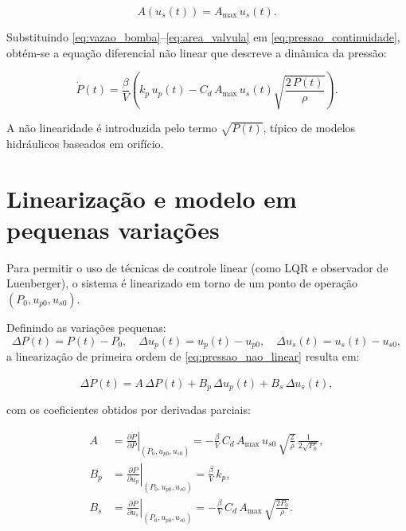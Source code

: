 \begin{equation}
A(u_s(t)) = A_{\max}\, u_s(t).
\label{eq:area_valvula}
\end{equation}

Substituindo \eqref{eq:vazao_bomba}--\eqref{eq:area_valvula} em \eqref{eq:pressao_continuidade}, obtém-se a equação diferencial não linear que descreve a dinâmica da pressão:

\begin{equation}
\dot{P}(t) =
\frac{\beta}{V}\left(
k_p\,u_p(t) - C_d\,A_{\max}\,u_s(t)\sqrt{\frac{2\,P(t)}{\rho}}
\right).
\label{eq:pressao_nao_linear}
\end{equation}

A não linearidade é introduzida pelo termo $\sqrt{P(t)}$, típico de modelos hidráulicos baseados em orifício.

\section{Linearização e modelo em pequenas variações}
\label{sec:controle-linearizacao}

Para permitir o uso de técnicas de controle linear (como LQR e observador de Luenberger), o sistema é linearizado em torno de um ponto de operação $(P_0, u_{p0}, u_{s0})$.

Definindo as variações pequenas:
\[
\Delta P(t)=P(t)-P_0, \quad
\Delta u_p(t)=u_p(t)-u_{p0}, \quad
\Delta u_s(t)=u_s(t)-u_{s0},
\]
a linearização de primeira ordem de \eqref{eq:pressao_nao_linear} resulta em:

\begin{equation}
\Delta\dot{P}(t) = A\,\Delta P(t) + B_p\,\Delta u_p(t) + B_s\,\Delta u_s(t),
\label{eq:linearizacao_geral}
\end{equation}

com os coeficientes obtidos por derivadas parciais:

\begin{align}
A &=
\left.\frac{\partial \dot{P}}{\partial P}\right|_{(P_0,u_{p0},u_{s0})}
= -\frac{\beta}{V}\, C_d\,A_{\max}\,u_{s0}\,
\sqrt{\frac{2}{\rho}}\,
\frac{1}{2\sqrt{P_0}},
\label{eq:coef_A}
\\[4pt]
B_p &=
\left.\frac{\partial \dot{P}}{\partial u_p}\right|_{(P_0,u_{p0},u_{s0})}
= \frac{\beta}{V}\,k_p,
\label{eq:coef_Bp}
\\[4pt]
B_s &=
\left.\frac{\partial \dot{P}}{\partial u_s}\right|_{(P_0,u_{p0},u_{s0})}
= -\frac{\beta}{V}\,C_d\,A_{\max}\,
\sqrt{\frac{2P_0}{\rho}}.
\label{eq:coef_Bs}
\end{align}

